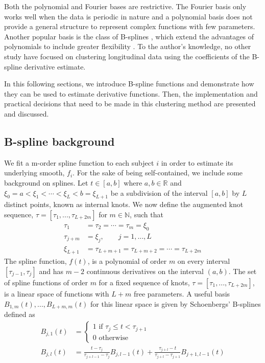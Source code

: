 Both the polynomial and Fourier bases are restrictive. The Fourier basis only works well when the data is periodic in nature and a polynomial basis does not provide a general structure to represent complex functions with few parameters. Another popular basis is the class of B-splines \cite{deboor1978, schumaker1981}, which extend the advantages of polynomials to include greater flexibility \cite{abraham2003}. To the author's knowledge, no other study have focused on clustering longitudinal data using the coefficients of the B-spline derivative estimate.

In this following sections, we introduce B-spline functions and demonstrate how they can be used to estimate derivative functions. Then, the implementation and practical decisions that need to be made in this clustering method are presented and discussed.
\subsection{B-spline background}
We fit a m-order spline function to each subject $i$ in order to estimate its underlying smooth, $f_i$. For the sake of being self-contained, we include some background on splines. Let $t\in[a,b]$ where $a,b\in\mathbb{R}$ and $\xi_0=a<\xi_{1}<\cdots<\xi_{L} < b = \xi_{L+1}$ be a subdivision of  the interval $[a,b]$ by $L$ distinct points, known as internal knots. We now define the augmented knot sequence, $\tau=[\tau_{1},...,\tau_{L+2m}]$ for $m\in\mathbb{N}$, such that 
\begin{align*}
\tau_{1}&=\tau_{2}=\cdots =\tau_{m} =\xi_{0}\\
\tau_{j+m}& = \xi_{j}, \quad\quad j=1,...,L\\
\xi_{L+1}&=\tau_{L+m+1}=\tau_{L+m+2}=\cdots =\tau_{L+2m} 
\end{align*}
The spline function, $f(t)$, is a polynomial of order $m$ on every interval $[\tau_{j-1},\tau_{j}]$ and has $m-2$ continuous derivatives on the interval $(a,b)$. The set of spline functions of order $m$ for a fixed sequence of knots, $\tau = [\tau_1,...,\tau_{L+2m}]$, is a linear space of functions with $L+m$ free parameters. A useful basis $B_{1,m}(t),...,B_{L+m,m}(t)$ for this linear space is given by Schoenbergs' B-splines \cite{curry1966, de1976} defined as
\begin{align*}
B_{j,1}(t) &= \begin{cases}
1 \text{ if }\tau_j\leq t < \tau_{j+1}\\
0\text{ otherwise}
\end{cases}\\
B_{j,l}(t) &= \frac{t-\tau_j}{\tau_{j+l-1}-\tau_j} B_{j,l-1}(t)+\frac{\tau_{j+l}-t}{\tau_{j+l}-\tau_{j+1}} B_{j+1,l-1}(t)
\end{align*}
